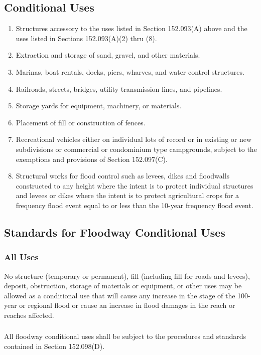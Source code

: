 \subsection{Conditional Uses}
\begin{enumerate}[{\indent}1)]
    \item Structures accessory to the uses listed in Section 152.093(A) above and the uses listed in Sections 152.093(A)(2) thru (8).
    \item Extraction and storage of sand, gravel, and other materials.
    \item Marinas, boat rentals, docks, piers, wharves, and water control structures.
    \item Railroads, streets, bridges, utility transmission lines, and pipelines.
    \item Storage yards for equipment, machinery, or materials.
    \item Placement of fill or construction of fences.
    \item Recreational vehicles either on individual lots of record or in existing or new subdivisions or commercial or condominium type campgrounds, subject to the exemptions and provisions of Section 152.097(C).
    \item Structural works for flood control such as levees, dikes and floodwalls constructed to any height where the intent is to protect individual structures and levees or dikes where the intent is to protect agricultural crops for a frequency flood event equal to or less than the 10-year frequency flood event.
\end{enumerate}
\subsection{Standards for Floodway Conditional Uses}
\subsubsection{All Uses}
No structure (temporary or permanent), fill (including fill for roads and levees), deposit, obstruction, storage of materials or equipment, or other uses may be allowed as a conditional use that will cause any increase in the stage of the 100-year or regional flood or cause an increase in flood damages in the reach or reaches affected.
\subsubsection{}
All floodway conditional uses shall be subject to the procedures and standards contained in Section 152.098(D).
